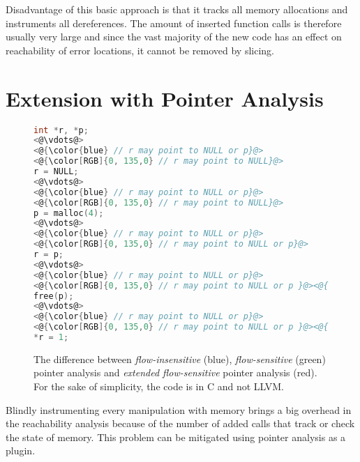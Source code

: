 Disadvantage of this basic approach is that it tracks all memory allocations and
instruments all dereferences. The amount of inserted function calls is
therefore usually very large and since the vast majority of the new code has
an effect on reachability of error locations, it cannot be removed by slicing.

\section{Extension with Pointer Analysis}\label{sec:pta}

\begin{figure}[t]
\begin{lstlisting}[language=C]
int *r, *p;
<@\vdots@>
<@{\color{blue} // r may point to NULL or p}@>
<@{\color[RGB]{0, 135,0} // r may point to NULL}@>
r = NULL;
<@\vdots@>
<@{\color{blue} // r may point to NULL or p}@>
<@{\color[RGB]{0, 135,0} // r may point to NULL}@>
p = malloc(4);
<@\vdots@>
<@{\color{blue} // r may point to NULL or p}@>
<@{\color[RGB]{0, 135,0} // r may point to NULL or p}@>
r = p;
<@\vdots@>
<@{\color{blue} // r may point to NULL or p}@>
<@{\color[RGB]{0, 135,0} // r may point to NULL or p }@><@{\color{red} or is invalidated}@>
free(p);
<@\vdots@>
<@{\color{blue} // r may point to NULL or p}@>
<@{\color[RGB]{0, 135,0} // r may point to NULL or p }@><@{\color{red} or is invalidated}@>
*r = 1;
\end{lstlisting}
\caption{The difference between \emph{flow-insensitive} (blue), \emph{flow-sensitive} (green) pointer analysis and \emph{extended flow-sensitive} pointer analysis (red). For the sake of simplicity, the code is in C and not LLVM.}
\label{fig:example2}
\end{figure}


Blindly instrumenting every manipulation with memory brings a big
overhead in the reachability analysis because of the number of added
calls that track or check the state of memory. This problem can be
mitigated using pointer analysis as a plugin.

